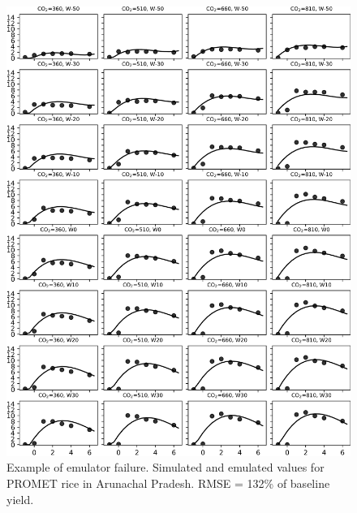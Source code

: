 \documentclass[10pt]{article}
\begin{document}
\begin{figure}[h!]
\includegraphics[width=\textwidth]{promet_rice_bad_arun.png}
\caption{Example of emulator failure. Simulated and emulated values for PROMET rice in Arunachal Pradesh. RMSE = 132\% of baseline yield.}
\label{fig:lpjmlrice}
\end{figure}
\end{document}

